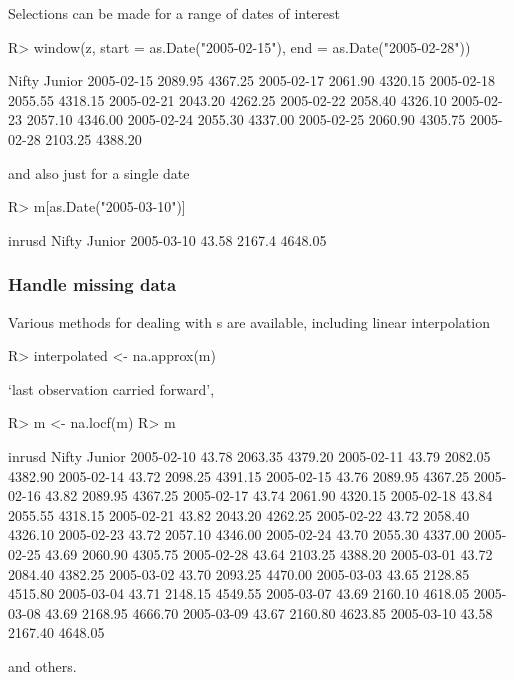 \documentclass{Z}
\newcommand{\mysection}[1]{\subsubsection[#1]{\textbf{#1}}}
\begin{document}
Selections can be made for a range of dates of interest
\begin{Schunk}
\begin{Sinput}
R> window(z, start = as.Date("2005-02-15"), end = as.Date("2005-02-28"))
\end{Sinput}
\begin{Soutput}
             Nifty  Junior
2005-02-15 2089.95 4367.25
2005-02-17 2061.90 4320.15
2005-02-18 2055.55 4318.15
2005-02-21 2043.20 4262.25
2005-02-22 2058.40 4326.10
2005-02-23 2057.10 4346.00
2005-02-24 2055.30 4337.00
2005-02-25 2060.90 4305.75
2005-02-28 2103.25 4388.20
\end{Soutput}
\end{Schunk}
and also just for a single date
\begin{Schunk}
\begin{Sinput}
R> m[as.Date("2005-03-10")]
\end{Sinput}
\begin{Soutput}
           inrusd  Nifty  Junior
2005-03-10  43.58 2167.4 4648.05
\end{Soutput}
\end{Schunk}

\mysection{Handle missing data}

Various methods for dealing with s are available, including
linear interpolation
\begin{Schunk}
\begin{Sinput}
R> interpolated <- na.approx(m)
\end{Sinput}
\end{Schunk}
`last observation carried forward',
\begin{Schunk}
\begin{Sinput}
R> m <- na.locf(m)
R> m
\end{Sinput}
\begin{Soutput}
           inrusd   Nifty  Junior
2005-02-10  43.78 2063.35 4379.20
2005-02-11  43.79 2082.05 4382.90
2005-02-14  43.72 2098.25 4391.15
2005-02-15  43.76 2089.95 4367.25
2005-02-16  43.82 2089.95 4367.25
2005-02-17  43.74 2061.90 4320.15
2005-02-18  43.84 2055.55 4318.15
2005-02-21  43.82 2043.20 4262.25
2005-02-22  43.72 2058.40 4326.10
2005-02-23  43.72 2057.10 4346.00
2005-02-24  43.70 2055.30 4337.00
2005-02-25  43.69 2060.90 4305.75
2005-02-28  43.64 2103.25 4388.20
2005-03-01  43.72 2084.40 4382.25
2005-03-02  43.70 2093.25 4470.00
2005-03-03  43.65 2128.85 4515.80
2005-03-04  43.71 2148.15 4549.55
2005-03-07  43.69 2160.10 4618.05
2005-03-08  43.69 2168.95 4666.70
2005-03-09  43.67 2160.80 4623.85
2005-03-10  43.58 2167.40 4648.05
\end{Soutput}
\end{Schunk}
and others.
\end{document}
